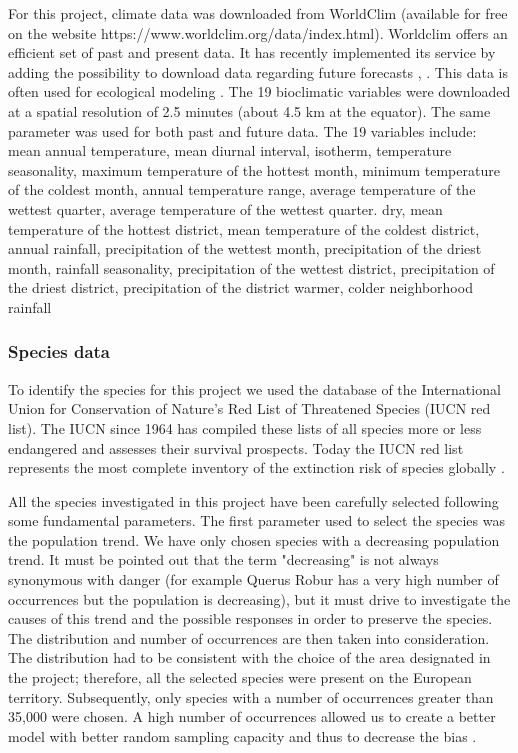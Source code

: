 \documentclass[12pt,a4paper]{article}
\begin{document}
For this project, climate data was downloaded from WorldClim (available for free on the website https://www.worldclim.org/data/index.html).
Worldclim offers an efficient set of past and present data. It has recently implemented its service by adding the possibility to download data regarding future forecasts \citep{wc}, \citep{ey}. This data is often used for ecological modeling \citep{bcw}. 
The 19 bioclimatic variables were downloaded at a spatial resolution of 2.5 minutes (about 4.5 km at the equator). The same parameter was used for both past and future data.
The 19 variables include: mean annual temperature, mean diurnal interval, isotherm, temperature seasonality, maximum temperature of the hottest month, minimum temperature of the coldest month, annual temperature range, average temperature of the wettest quarter, average temperature of the wettest quarter. dry, mean temperature of the hottest district, mean temperature of the coldest district, annual rainfall, precipitation of the wettest month, precipitation of the driest month, rainfall seasonality, precipitation of the wettest district, precipitation of the driest district, precipitation of the district warmer, colder neighborhood rainfall 

\subsubsection{Species data}
To identify the species for this project we used the database of the International Union for Conservation of Nature's Red List of Threatened Species (IUCN red list).
The IUCN since 1964 has compiled these lists of all species more or less endangered and assesses their survival prospects. Today the IUCN red list represents the most complete inventory of the extinction risk of species globally \citep {IUCN}.

All the species investigated in this project have been carefully selected following some fundamental parameters.
The first parameter used to select the species was the population trend. We have only chosen species with a decreasing population trend. It must be pointed out that the term "decreasing" is not always synonymous with danger (for example Querus Robur has a very high number of occurrences but the population is decreasing), but it must drive to investigate the causes of this trend and the possible responses in order to preserve the species.
The distribution and number of occurrences are then taken into consideration. The distribution had to be consistent with the choice of the area designated in the project; therefore, all the selected species were present on the European territory. Subsequently, only species with a number of occurrences greater than 35,000 were chosen. A high number of occurrences allowed us to create a better model with better random sampling capacity and thus to decrease the bias \citep {kaplan} .
\end{document}
